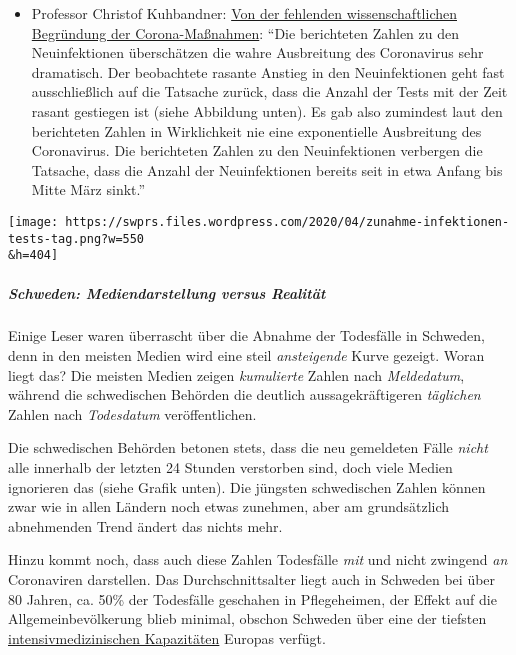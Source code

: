 \begin{itemize}
\item
  Professor Christof Kuhbandner:
  \href{https://www.heise.de/tp/features/Von-der-fehlenden-wissenschaftlichen-Begruendung-der-Corona-Massnahmen-4709563.html?seite=all}{Von
  der fehlenden wissenschaftlichen Begründung der Corona-Maßnahmen}:
  ``Die berichteten Zahlen zu den Neuinfektionen überschätzen die wahre
  Ausbreitung des Coronavirus sehr dramatisch. Der beobachtete rasante
  Anstieg in den Neuinfektionen geht fast ausschließlich auf die
  Tatsache zurück, dass die Anzahl der Tests mit der Zeit rasant
  gestiegen ist (siehe Abbildung unten). Es gab also zumindest laut den
  berichteten Zahlen in Wirklichkeit nie eine exponentielle Ausbreitung
  des Coronavirus. Die berichteten Zahlen zu den Neuinfektionen
  verbergen die Tatsache, dass die Anzahl der Neuinfektionen bereits
  seit in etwa Anfang bis Mitte März sinkt.''
\end{itemize}

\texttt{[image: https://swprs.files.wordpress.com/2020/04/zunahme-infektionen-tests-tag.png?w=550\\\&h=404]}

\hypertarget{schweden-mediendarstellung-versus-realituxe4t}{%
\subparagraph{\texorpdfstring{\textbf{Schweden: Mediendarstellung versus
Realität}}{Schweden: Mediendarstellung versus Realität}}\label{schweden-mediendarstellung-versus-realituxe4t}}

Einige Leser waren überrascht über die Abnahme der Todesfälle in
Schweden, denn in den meisten Medien wird eine steil \emph{ansteigende}
Kurve gezeigt. Woran liegt das? Die meisten Medien zeigen
\emph{kumulierte} Zahlen nach \emph{Meldedatum}, während die
schwedischen Behörden die deutlich aussagekräftigeren \emph{täglichen}
Zahlen nach \emph{Todesdatum} veröffentlichen.

Die schwedischen Behörden betonen stets, dass die neu gemeldeten Fälle
\emph{nicht} alle innerhalb der letzten 24 Stunden verstorben sind, doch
viele Medien ignorieren das (siehe Grafik unten). Die jüngsten
schwedischen Zahlen können zwar wie in allen Ländern noch etwas
zunehmen, aber am grundsätzlich abnehmenden Trend ändert das nichts
mehr.

Hinzu kommt noch, dass auch diese Zahlen Todesfälle \emph{mit} und nicht
zwingend \emph{an} Coronaviren darstellen. Das Durchschnittsalter liegt
auch in Schweden bei über 80 Jahren, ca. 50\% der Todesfälle geschahen
in Pflegeheimen, der Effekt auf die Allgemeinbevölkerung blieb minimal,
obschon Schweden über eine der tiefsten
\href{https://link.springer.com/article/10.1007/s00134-012-2627-8}{intensivmedizinischen
Kapazitäten} Europas verfügt.

